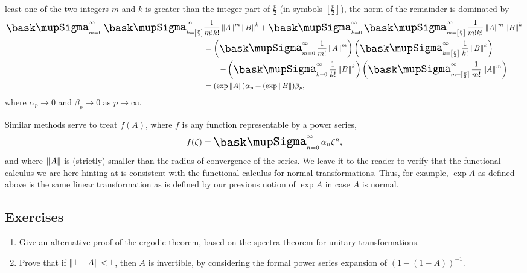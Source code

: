 least one of the two integers \(m\) and \(k\) is greater than the integer part
of \(\displaystyle\frac{p}{2}\) (in symbols \(\left[\frac{p}{2}\right]\)), the
norm of the remainder is dominated by
\begin{align*}
   \sumx_{m=0}^{\infty} \sumx_{k=\left[\frac{p}{2}\right]}^{\infty} &\frac{1}{m!k!} \norm{A}^m \norm{B}^k + \sumx_{k=0}^{\infty} \sumx_{m=\left[\frac{p}{2}\right]}^{\infty} \frac{1}{m!k!} \norm{A}^m \norm{B}^k \\
   & = \left(\sumx_{m=0}^{\infty} \frac{1}{m!} \norm{A}^m\right) \left(\sumx_{k=\left[\frac{p}{2}\right]}^{\infty} \frac{1}{k!} \norm{B}^k\right)\\ &\qquad + \left(\sumx_{k=0}^{\infty} \frac{1}{k!} \norm{B}^k\right) \left(\sumx_{m=\left[\frac{p}{2}\right]}^{\infty} \frac{1}{m!} \norm{A}^m\right)\\
   & = (\exp \norm{A})\alpha_p + (\exp \norm{B})\beta_p,
\end{align*}
where \(\alpha_p \to 0\) and \(\beta_p \to 0\) as \(p \to \infty\).
 
Similar methods serve to treat \(f(A)\), where \(f\) is any function
representable by a power series,
\begin{equation*}
    f(\zeta) = \sumx_{n=0}^{\infty} \alpha_n \zeta^n,
\end{equation*}
and where \(\left\lVert A\right\rVert\) is (strictly) smaller than the radius of convergence of
the series. We leave it to the reader to verify that the functional calculus we
are here hinting at is consistent with the functional calculus for normal
transformations. Thus, for example, \(\exp A\) as defined above is the same
linear transformation as is defined by our previous notion of \(\exp A\) in case
\(A\) is normal.

{\small
\subsection*{Exercises}
\begin{enumerate}[wide]
    \item Give an alternative proof of the ergodic theorem, based on the spectra theorem for unitary transformations.
    \item Prove that if \(\left\lVert1 - A\right\rVert < 1\), then \(A\) is invertible, by considering the formal power series expansion of \((1 - (1 - A))^{-1}\).
\end{enumerate}
}